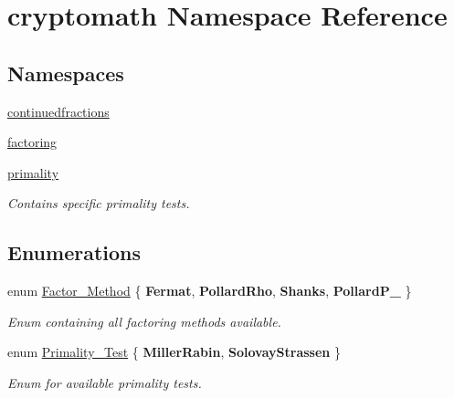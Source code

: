 \hypertarget{namespacecryptomath}{}\section{cryptomath Namespace Reference}
\label{namespacecryptomath}
\subsection*{Namespaces}
\begin{DoxyCompactItemize}
\item 
 \hyperlink{namespacecryptomath_1_1continuedfractions}{continuedfractions}
\item 
 \hyperlink{namespacecryptomath_1_1factoring}{factoring}
\item 
 \hyperlink{namespacecryptomath_1_1primality}{primality}
\begin{DoxyCompactList}\small\item\em Contains specific primality tests. \end{DoxyCompactList}\end{DoxyCompactItemize}
\subsection*{Enumerations}
\begin{DoxyCompactItemize}
\item 
enum \hyperlink{namespacecryptomath_a66e56d7b478803e17352ef017eb1264b}{Factor\+\_\+\+Method} \{ {\bfseries Fermat}, 
{\bfseries Pollard\+Rho}, 
{\bfseries Shanks}, 
{\bfseries Pollard\+P\+\_}
 \}\hypertarget{namespacecryptomath_a66e56d7b478803e17352ef017eb1264b}{}\label{namespacecryptomath_a66e56d7b478803e17352ef017eb1264b}
\begin{DoxyCompactList}\small\item\em Enum containing all factoring methods available. \end{DoxyCompactList}
\item 
enum \hyperlink{namespacecryptomath_ad814ed5cc6da07c16839c8ee79f0830d}{Primality\+\_\+\+Test} \{ {\bfseries Miller\+Rabin}, 
{\bfseries Solovay\+Strassen}
 \}\hypertarget{namespacecryptomath_ad814ed5cc6da07c16839c8ee79f0830d}{}\label{namespacecryptomath_ad814ed5cc6da07c16839c8ee79f0830d}
\begin{DoxyCompactList}\small\item\em Enum for available primality tests. \end{DoxyCompactList}
\end{DoxyCompactItemize}
